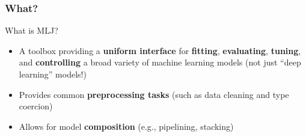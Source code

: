 \documentclass[t]{beamer}
\newcommand\df{\bf\color{Maroon}}
\begin{document}


\begin{frame}
  \frametitle{What?}
  \begin{block}{What is MLJ?}\pause
     \begin{itemize}
     \item A toolbox providing a {\df uniform interface} for {\df
         fitting}, {\df evaluating}, {\df tuning}, and {\df
         controlling} a broad variety of machine learning models (not
       just ``deep learning'' models!)
          \item Provides common {\df preprocessing tasks} (such as data cleaning
            and type coercion)
          \item Allows for model {\df composition} (e.g., pipelining, stacking)
      \end{itemize}
    \end{block}
  \end{frame}



\end{document}
